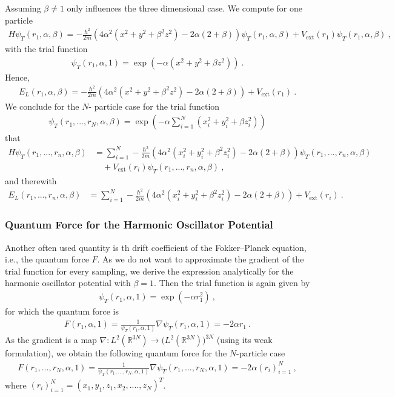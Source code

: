\documentclass[11pt,a4paper]{article}
\numberwithin{equation}{section}
\begin{document}
Assuming $\beta\neq 1 $ only influences the three dimensional case. 
%
We compute for one particle
\begin{align*}
H \psi_T(r_1,\alpha,\beta)
=
-\frac{\hbar^2}{2m}\left(4\alpha^2(x^2+y^2+\beta^2z^2)-2\alpha (2+\beta)\right)\psi_T(r_1,\alpha,\beta)+V_{\mathrm{ext}}(r_1)\psi_T(r_1,\alpha,\beta)~,
\end{align*}
with the trial function
\begin{align*}
\psi_T(r_1,\alpha,1) = \exp(-\alpha (x^2+y^2+\beta z^2))~.
\end{align*}
Hence,
\begin{align*}
E_{L}(r_1,\alpha,\beta)
=
-\frac{\hbar^2}{2m}\left(4\alpha^2(x^2+y^2+\beta^2z^2)-2\alpha (2+\beta)\right)+V_{\mathrm{ext}}(r_1)~.
\end{align*}
We conclude for the $N$- particle case for the trial function
\begin{align*}
\psi_T(r_1,...,r_N,\alpha,\beta) = \exp(-\alpha \sum_{i=1}^{N}(x_i^2+y_i^2+\beta z_i^2))
\end{align*}
that
\begin{align*}
H \psi_T(r_1,...,r_n,\alpha,\beta)
&=
\sum_{i=1}^N-\frac{\hbar^2}{2m}\left(4\alpha^2(x_i^2+y_i^2+\beta^2z_i^2)-2\alpha (2+\beta)\right)\psi_T(r_1,...,r_n,\alpha,\beta)\\
&\quad +V_{\mathrm{ext}}(r_i)\psi_T(r_1,...,r_n,\alpha,\beta)~,
\end{align*}
and therewith
\begin{align*}
E_L(r_1,...,r_n,\alpha,\beta)
&=
\sum_{i=1}^N-\frac{\hbar^2}{2m}\left(4\alpha^2(x_i^2+y_i^2+\beta^2z_i^2)-2\alpha (2+\beta)\right)+V_{\mathrm{ext}}(r_i)~.
\end{align*}

\subsubsection{Quantum Force for the Harmonic Oscillator Potential}
%
%
Another often used quantity is th drift coefficient of the Fokker--Planck equation, i.e., the quantum force $F$. 
%
As we do not want to approximate the gradient of the trial function for every sampling, we derive the expression analytically for the harmonic oscillator potential with $\beta =1$.
%
Then the trial function is again given by    
\begin{align*}
\psi_T(r_1,\alpha,1) = \exp(-\alpha r_1^2)~,
\end{align*}
for which the quantum force is
\begin{align*}
F(r_1,\alpha,1) = \frac{1}{\psi_T(r_1,\alpha,1)}\nabla \psi_T(r_1,\alpha,1)
=
-2\alpha r_1~.
\end{align*}
As the gradient is a map $\nabla:L^2(\mathbb{R}^{3N})\to \big(L^2(\mathbb{R}^{3N})\big)^{3N}$ (using its weak formulation), we obtain the following quantum force for the $N$-particle case
\begin{align*}
F(r_1,...,r_N,\alpha,1) = \frac{1}{\psi_T(r_1,...,r_N,\alpha,1)}\nabla \psi_T(r_1,...,r_N,\alpha,1)
=
-2\alpha (r_i)_{i=1}^N~,
\end{align*}
where $(r_i)_{i=1}^N = (x_1, y_1 , z_1, x_2,...., z_N)^T$.
\end{document}
